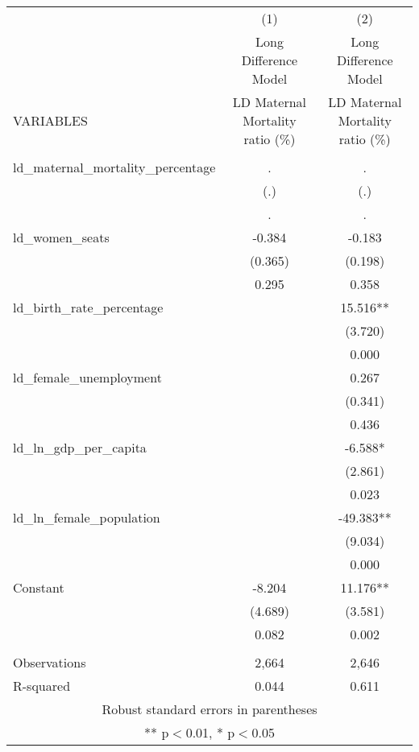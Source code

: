 \begin{tabular}{lcc} \hline
 & (1) & (2) \\
 & Long Difference Model & Long Difference Model \\
VARIABLES & LD Maternal Mortality ratio (\%) & LD Maternal Mortality ratio (\%) \\ \hline
 &  &  \\
ld\_maternal\_mortality\_percentage & . & . \\
 & (.) & (.) \\
 & . & . \\
ld\_women\_seats & -0.384 & -0.183 \\
 & (0.365) & (0.198) \\
 & 0.295 & 0.358 \\
ld\_birth\_rate\_percentage &  & 15.516** \\
 &  & (3.720) \\
 &  & 0.000 \\
ld\_female\_unemployment &  & 0.267 \\
 &  & (0.341) \\
 &  & 0.436 \\
ld\_ln\_gdp\_per\_capita &  & -6.588* \\
 &  & (2.861) \\
 &  & 0.023 \\
ld\_ln\_female\_population &  & -49.383** \\
 &  & (9.034) \\
 &  & 0.000 \\
Constant & -8.204 & 11.176** \\
 & (4.689) & (3.581) \\
 & 0.082 & 0.002 \\
 &  &  \\
Observations & 2,664 & 2,646 \\
 R-squared & 0.044 & 0.611 \\ \hline
\multicolumn{3}{c}{ Robust standard errors in parentheses} \\
\multicolumn{3}{c}{ ** p$<$0.01, * p$<$0.05} \\
\end{tabular}
